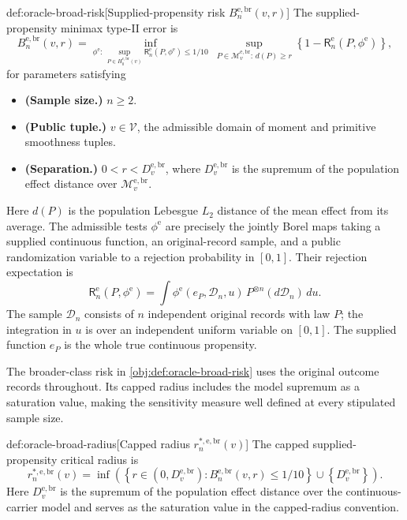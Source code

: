 \begin{definitionv}{def:oracle-broad-risk}[Supplied-propensity risk \(B_n^{\mathrm{e,br}}(v,r)\)]
The supplied-propensity minimax type-II error is
\[
 B_n^{\mathrm{e,br}}(v,r)=
 \inf_{\phi^{\mathrm e}:\,
     \sup_{P\in H_0^{\mathrm{e,br}}(v)}
       \mathsf R_n^{\mathrm e}(P,\phi^{\mathrm e})\le1/10}
 \ \sup_{P\in\mathcal M_v^{\mathrm{e,br}}:\,d(P)\ge r}
       \left\{1-\mathsf R_n^{\mathrm e}(P,\phi^{\mathrm e})\right\},
\]
for parameters satisfying
\begin{itemize}
\item \textbf{(Sample size.)} \(n\ge2\).
\item \textbf{(Public tuple.)} \(v\in\mathcal V\), the admissible domain of moment and primitive smoothness tuples.
\item \textbf{(Separation.)} \(0<r<D_v^{\mathrm{e,br}}\), where \(D_v^{\mathrm{e,br}}\) is the supremum of the population effect distance over \(\mathcal M_v^{\mathrm{e,br}}\).
\end{itemize}
Here \(d(P)\) is the population Lebesgue \(L_2\) distance of the mean effect from its average. The admissible tests \(\phi^{\mathrm e}\) are precisely the jointly Borel maps taking a supplied continuous function, an original-record sample, and a public randomization variable to a rejection probability in \([0,1]\). Their rejection expectation is
\[
 \mathsf R_n^{\mathrm e}(P,\phi^{\mathrm e})
 =\int \phi^{\mathrm e}(e_P,\mathcal D_n,u)\,
       P^{\otimes n}(d\mathcal D_n)\,du.
\]
The sample \(\mathcal D_n\) consists of \(n\) independent original records with law \(P\); the integration in \(u\) is over an independent uniform variable on \([0,1]\). The supplied function \(e_P\) is the whole true continuous propensity.
\end{definitionv}

The broader-class risk  in \cref{obj:def:oracle-broad-risk} uses the original outcome records throughout. Its capped radius includes the model supremum as a saturation value, making the sensitivity measure well defined at every stipulated sample size.

\begin{definitionv}{def:oracle-broad-radius}[Capped radius \(r_n^{*,\mathrm{e,br}}(v)\)]
The capped supplied-propensity critical radius is
\[
 r_n^{*,\mathrm{e,br}}(v)=
 \inf\left(
 \left\{r\in(0,D_v^{\mathrm{e,br}}):
 B_n^{\mathrm{e,br}}(v,r)\le1/10\right\}
 \cup\left\{D_v^{\mathrm{e,br}}\right\}\right).
\]
Here \(D_v^{\mathrm{e,br}}\) is the supremum of the population effect distance over the continuous-carrier model and serves as the saturation value in the capped-radius convention.
\end{definitionv}

